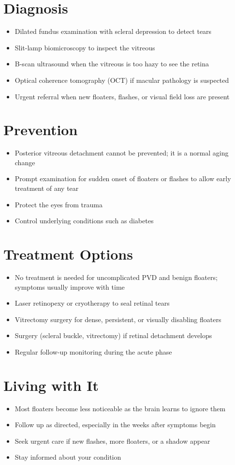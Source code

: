 \section{Diagnosis}
\begin{itemize}[noitemsep]
  \item Dilated fundus examination with scleral depression to detect tears
  \item Slit-lamp biomicroscopy to inspect the vitreous
  \item B-scan ultrasound when the vitreous is too hazy to see the retina
  \item Optical coherence tomography (OCT) if macular pathology is suspected
  \item Urgent referral when new floaters, flashes, or visual field loss are present
\end{itemize}
\section{Prevention}
\begin{itemize}[noitemsep]
  \item Posterior vitreous detachment cannot be prevented; it is a normal aging change
  \item Prompt examination for sudden onset of floaters or flashes to allow early treatment of any tear
  \item Protect the eyes from trauma
  \item Control underlying conditions such as diabetes
\end{itemize}
\section{Treatment Options}
\begin{itemize}[noitemsep]
  \item No treatment is needed for uncomplicated PVD and benign floaters; symptoms usually improve with time
  \item Laser retinopexy or cryotherapy to seal retinal tears
  \item Vitrectomy surgery for dense, persistent, or visually disabling floaters
  \item Surgery (scleral buckle, vitrectomy) if retinal detachment develops
  \item Regular follow-up monitoring during the acute phase
\end{itemize}
\section{Living with It}
\begin{itemize}[noitemsep]
  \item Most floaters become less noticeable as the brain learns to ignore them
  \item Follow up as directed, especially in the weeks after symptoms begin
  \item Seek urgent care if new flashes, more floaters, or a shadow appear
  \item Stay informed about your condition
\end{itemize}
